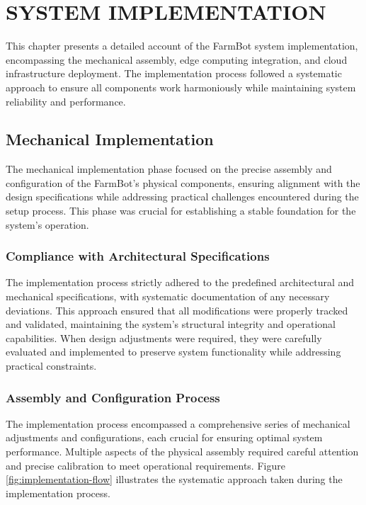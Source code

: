 \chapter{SYSTEM IMPLEMENTATION}

This chapter presents a detailed account of the FarmBot system implementation, encompassing the mechanical assembly, edge computing integration, and cloud infrastructure deployment. The implementation process followed a systematic approach to ensure all components work harmoniously while maintaining system reliability and performance.

\section{Mechanical Implementation}

The mechanical implementation phase focused on the precise assembly and configuration of the FarmBot's physical components, ensuring alignment with the design specifications while addressing practical challenges encountered during the setup process. This phase was crucial for establishing a stable foundation for the system's operation.

\subsection{Compliance with Architectural Specifications}
The implementation process strictly adhered to the predefined architectural and mechanical specifications, with systematic documentation of any necessary deviations. This approach ensured that all modifications were properly tracked and validated, maintaining the system's structural integrity and operational capabilities. When design adjustments were required, they were carefully evaluated and implemented to preserve system functionality while addressing practical constraints.

\subsection{Assembly and Configuration Process}
The implementation process encompassed a comprehensive series of mechanical adjustments and configurations, each crucial for ensuring optimal system performance. Multiple aspects of the physical assembly required careful attention and precise calibration to meet operational requirements. Figure \ref{fig:implementation-flow} illustrates the systematic approach taken during the implementation process.

